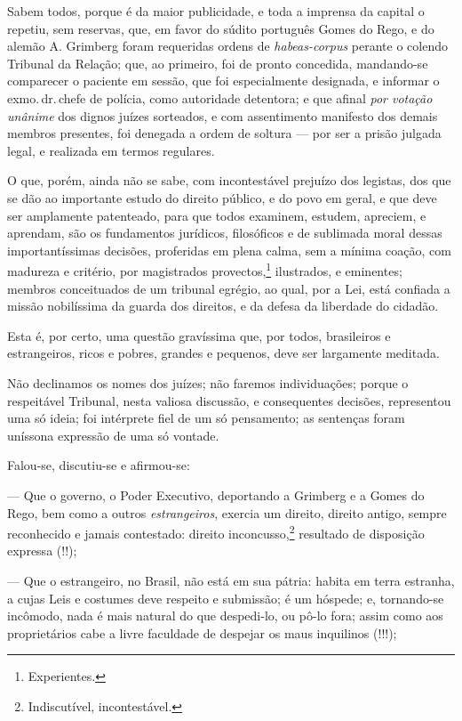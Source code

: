 Sabem todos, porque é da maior publicidade, e toda a imprensa da capital
o repetiu, sem reservas, que, em favor do súdito português Gomes do
Rego, e do alemão A. Grimberg foram requeridas ordens de
\emph{habeas-corpus} perante o colendo Tribunal da Relação; que, ao
primeiro, foi de pronto concedida, mandando-se comparecer o paciente em
sessão, que foi especialmente designada, e informar o exmo.\,dr.\,chefe de
polícia, como autoridade detentora; e que afinal \emph{por votação
unânime} dos dignos juízes sorteados, e com assentimento manifesto dos
demais membros presentes, foi denegada a ordem de soltura --- por ser a
prisão julgada legal, e realizada em termos regulares.

O que, porém, ainda não se sabe, com incontestável prejuízo dos
legistas, dos que se dão ao importante estudo do direito público, e do
povo em geral, e que deve ser amplamente patenteado, para que todos
examinem, estudem, apreciem, e aprendam, são os fundamentos jurídicos,
filosóficos e de sublimada moral dessas importantíssimas decisões,
proferidas em plena calma, sem a mínima coação, com madureza e critério,
por magistrados provectos,\footnote{Experientes.} ilustrados, e
eminentes; membros conceituados de um tribunal egrégio, ao qual, por a
Lei, está confiada a missão nobilíssima da guarda dos direitos, e da
defesa da liberdade do cidadão.

Esta é, por certo, uma questão gravíssima que, por todos, brasileiros e
estrangeiros, ricos e pobres, grandes e pequenos, deve ser largamente
meditada.

Não declinamos os nomes dos juízes; não faremos individuações; porque o
respeitável Tribunal, nesta valiosa discussão, e consequentes decisões,
representou uma só ideia; foi intérprete fiel de um só pensamento; as
sentenças foram uníssona expressão de uma só vontade.

Falou-se, discutiu-se e afirmou-se:

--- Que o governo, o Poder Executivo, deportando a Grimberg e a Gomes
  do Rego, bem como a outros \emph{estrangeiros}, exercia um direito,
  direito antigo, sempre reconhecido e jamais contestado: direito
  inconcusso,\footnote{Indiscutível, incontestável.} resultado de
  disposição expressa (!!);

--- Que o estrangeiro, no Brasil, não está em sua pátria: habita em
  terra estranha, a cujas Leis e costumes deve respeito e submissão; é
  um hóspede; e, tornando-se incômodo, nada é mais natural do que
  despedi-lo, ou pô-lo fora; assim como aos proprietários cabe a livre
  faculdade de despejar os maus inquilinos (!!!);

